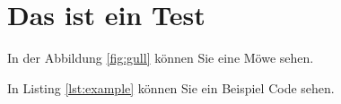 \chapter{Das ist ein Test}

In der Abbildung \ref{fig:gull} können Sie eine Möwe sehen.


In Listing \ref{lst:example} können Sie ein Beispiel Code sehen.



\Blinddocument

\Blinddocument
